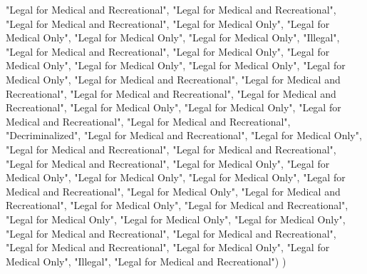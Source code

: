 \documentclass[
]{article}
\newenvironment{Shaded}{\begin{snugshade}}{\end{snugshade}}
\newcommand{\NormalTok}[1]{#1}
\newcommand{\StringTok}[1]{\textcolor[rgb]{0.31,0.60,0.02}{#1}}
\begin{document}
\begin{Shaded}
\begin{Highlighting}[]
                      \StringTok{"Legal for Medical and Recreational"}\NormalTok{, }\StringTok{"Legal for Medical and Recreational"}\NormalTok{, }
                      \StringTok{"Legal for Medical and Recreational"}\NormalTok{, }\StringTok{"Legal for Medical Only"}\NormalTok{, }
                      \StringTok{"Legal for Medical Only"}\NormalTok{, }\StringTok{"Legal for Medical Only"}\NormalTok{, }
                      \StringTok{"Legal for Medical Only"}\NormalTok{, }\StringTok{"Illegal"}\NormalTok{, }\StringTok{"Legal for Medical and Recreational"}\NormalTok{, }
                      \StringTok{"Legal for Medical Only"}\NormalTok{, }\StringTok{"Legal for Medical Only"}\NormalTok{, }
                      \StringTok{"Legal for Medical Only"}\NormalTok{, }\StringTok{"Legal for Medical Only"}\NormalTok{, }
                      \StringTok{"Legal for Medical Only"}\NormalTok{, }\StringTok{"Legal for Medical and Recreational"}\NormalTok{, }
                      \StringTok{"Legal for Medical and Recreational"}\NormalTok{, }\StringTok{"Legal for Medical and Recreational"}\NormalTok{, }
                      \StringTok{"Legal for Medical and Recreational"}\NormalTok{, }\StringTok{"Legal for Medical Only"}\NormalTok{, }
                      \StringTok{"Legal for Medical Only"}\NormalTok{, }\StringTok{"Legal for Medical and Recreational"}\NormalTok{, }
                      \StringTok{"Legal for Medical and Recreational"}\NormalTok{, }\StringTok{"Decriminalized"}\NormalTok{, }
                      \StringTok{"Legal for Medical and Recreational"}\NormalTok{, }\StringTok{"Legal for Medical Only"}\NormalTok{, }
                      \StringTok{"Legal for Medical and Recreational"}\NormalTok{, }\StringTok{"Legal for Medical and Recreational"}\NormalTok{, }
                      \StringTok{"Legal for Medical and Recreational"}\NormalTok{, }\StringTok{"Legal for Medical Only"}\NormalTok{, }
                      \StringTok{"Legal for Medical Only"}\NormalTok{, }\StringTok{"Legal for Medical Only"}\NormalTok{, }
                      \StringTok{"Legal for Medical Only"}\NormalTok{, }\StringTok{"Legal for Medical and Recreational"}\NormalTok{, }
                      \StringTok{"Legal for Medical Only"}\NormalTok{, }\StringTok{"Legal for Medical and Recreational"}\NormalTok{, }
                      \StringTok{"Legal for Medical Only"}\NormalTok{, }\StringTok{"Legal for Medical and Recreational"}\NormalTok{, }
                      \StringTok{"Legal for Medical Only"}\NormalTok{, }\StringTok{"Legal for Medical Only"}\NormalTok{, }
                      \StringTok{"Legal for Medical Only"}\NormalTok{, }\StringTok{"Legal for Medical and Recreational"}\NormalTok{, }
                      \StringTok{"Legal for Medical and Recreational"}\NormalTok{, }\StringTok{"Legal for Medical and Recreational"}\NormalTok{, }
                      \StringTok{"Legal for Medical Only"}\NormalTok{, }\StringTok{"Legal for Medical Only"}\NormalTok{, }\StringTok{"Illegal"}\NormalTok{, }
                      \StringTok{"Legal for Medical and Recreational"}\NormalTok{)}
\NormalTok{)}


\end{Highlighting}
\end{Shaded}
\end{document}
